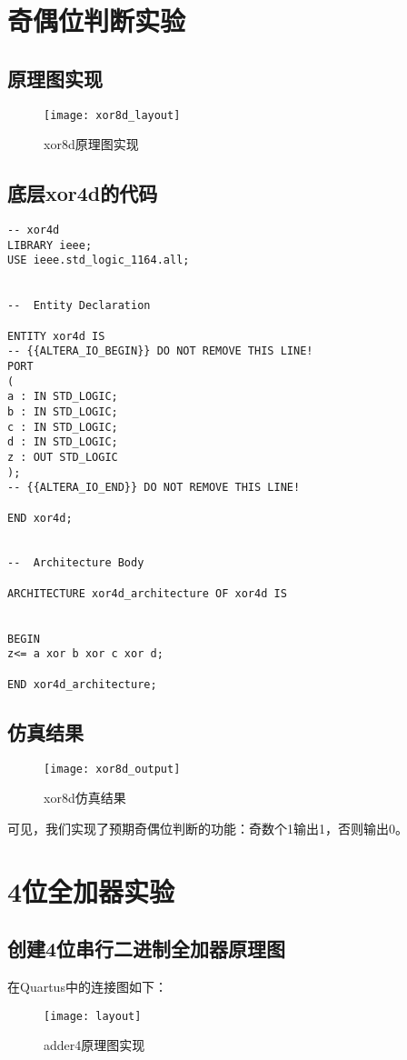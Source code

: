 \documentclass{article}
\begin{document}
\section{奇偶位判断实验}
\subsection{原理图实现}
\begin{figure}[H]
\centering
\texttt{[image: xor8d\_layout]}
\caption{xor8d原理图实现}
\end{figure}
\subsection{底层xor4d的代码}
\begin{lstlisting}
-- xor4d
LIBRARY ieee;
USE ieee.std_logic_1164.all;


--  Entity Declaration

ENTITY xor4d IS
-- {{ALTERA_IO_BEGIN}} DO NOT REMOVE THIS LINE!
PORT
(
a : IN STD_LOGIC;
b : IN STD_LOGIC;
c : IN STD_LOGIC;
d : IN STD_LOGIC;
z : OUT STD_LOGIC
);
-- {{ALTERA_IO_END}} DO NOT REMOVE THIS LINE!

END xor4d;


--  Architecture Body

ARCHITECTURE xor4d_architecture OF xor4d IS


BEGIN
z<= a xor b xor c xor d;

END xor4d_architecture;
\end{lstlisting}
\subsection{仿真结果}
\begin{figure}[H]
\centering
\texttt{[image: xor8d\_output]}
\caption{xor8d仿真结果}
\end{figure}
可见，我们实现了预期奇偶位判断的功能：奇数个1输出1，否则输出0。
\section{4位全加器实验}

\subsection{创建4位串行二进制全加器原理图}
在Quartus中的连接图如下：
\begin{figure}[H]
\centering
\texttt{[image: layout]}
\caption{adder4原理图实现}
\end{figure}
\end{document}
